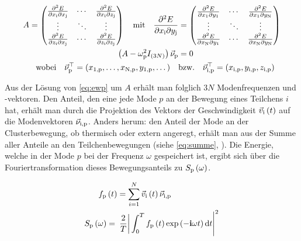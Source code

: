           \begin{align}
            A=
            \begin{pmatrix}
            \frac{\partial^2 E}{\partial x_\text{i} \partial x_\text{j}} & \cdots & \frac{\partial^2 E}{\partial x_\text{i} \partial z_\text{j}} \\ 
            \vdots & \ddots & \vdots \\ 
            \frac{\partial^2 E}{\partial z_\text{i} \partial x_\text{j}} & \cdots & \frac{\partial^2 E}{\partial z_\text{i} \partial z_\text{j}}
            \end{pmatrix} 
            \quad \text{mit} \quad \frac{\partial^2 E}{\partial x_\text{i}\partial y_\text{j}}&=
            \begin{pmatrix}
            \frac{\partial^2 E}{\partial x_\text{1} \partial y_\text{1}} & \cdots & \frac{\partial^2 E}{\partial x_\text{1} \partial y_\text{N}} \\ 
            \vdots & \ddots & \vdots \\ 
            \frac{\partial^2 E}{\partial x_\text{N} \partial y_\text{1}} & \cdots & \frac{\partial^2 E}{\partial x_\text{N} \partial y_\text{N}}
            \end{pmatrix}
            \label{eq:matrix} \\
            \left(A-\omega_\text{p}^2I_{(3N)}\right)\vec{\nu}_\text{p}&=0 \label{eq:ewp} \\ 
            \text{wobei} \quad \vec{\nu}_\text{p}^\top=\left(x_\text{1,p},\dots,x_\text{N,p},y_\text{1,p},\dots\right) \quad &\text{bzw.} \quad \vec{\nu}_\text{i,p}^\top=\left(x_\text{i,p},y_\text{i,p},z_\text{i,p}\right) \nonumber
          \end{align}

        Aus der Lösung von \autoref{eq:ewp} um $A$ erhält man folglich $3N$ Modenfrequenzen und -vektoren. Den Anteil, den eine jede Mode $p$ an der Bewegung eines Teilchens $i$ hat, erhält man durch die Projektion des Vektors der Geschwindigkeit $\vec{v}_\text{i}\left(t\right)$ auf die Modenvektoren $\vec{\nu}_\text{i,p}$. Anders herum: den Anteil der Mode an der Clusterbewegung, ob thermisch oder extern angeregt, erhält man aus der Summe aller Anteile an den Teilchenbewegungen (siehe \autoref{eq:summe}, \cite{Melzer03}). Die Energie, welche in der Mode $p$ bei der Frequenz $\omega$ gespeichert ist, ergibt sich über die Fouriertransformation dieses Bewegungsanteils zu $S_\text{p}\left(\omega\right)$.

          \begin{align}
            f_\text{p}&\left(t\right)=\sum_{i=1}^{N}\vec{v}_\text{i}\left(t\right)\vec{\nu}_\text{i,p} \label{eq:summe} \\
            S_\text{p}\left(\omega\right)&=\left.\left.\frac{2}{T}\right|\int_{0}^{T}f_\text{p}\left(t\right)\exp\left(-\mathbf{i}\omega t\right)\textnormal{d} t\right|^2 \label{eq:energiedicht}
          \end{align}

